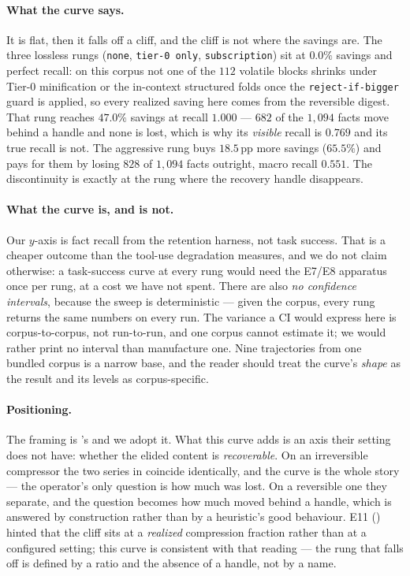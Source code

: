 \documentclass[11pt]{article}
\begin{document}
\paragraph{What the curve says.} It is flat, then it falls off a cliff, and the cliff is
not where the savings are. The three lossless rungs (\texttt{none}, \texttt{tier-0 only},
\texttt{subscription}) sit at $0.0\%$ savings and perfect recall: on this corpus not one of
the $112$ volatile blocks shrinks under Tier-0 minification or the in-context structured
folds once the \texttt{reject-if-bigger} guard is applied, so every realized saving here
comes from the reversible digest. That rung reaches $47.0\%$ savings at recall $1.000$ ---
$682$ of the $1{,}094$ facts move behind a handle and none is lost, which is why its
\emph{visible} recall is $0.769$ and its true recall is not. The aggressive rung buys
$18.5$\,pp more savings ($65.5\%$) and pays for them by losing $828$ of $1{,}094$ facts
outright, macro recall $0.551$. The discontinuity is exactly at the rung where the recovery
handle disappears.

\paragraph{What the curve is, and is not.} Our $y$-axis is fact recall from the retention
harness, not task success. That is a cheaper outcome than the tool-use degradation
\cite{controlcompression} measures, and we do not claim otherwise: a task-success curve at
every rung would need the E7/E8 apparatus once per rung, at a cost we have not spent. There
are also \emph{no confidence intervals}, because the sweep is deterministic --- given the
corpus, every rung returns the same numbers on every run. The variance a CI would express
here is corpus-to-corpus, not run-to-run, and one corpus cannot estimate it; we would rather
print no interval than manufacture one. Nine trajectories from one bundled corpus is a
narrow base, and the reader should treat the curve's \emph{shape} as the result and its
levels as corpus-specific.

\paragraph{Positioning.} The framing is \cite{controlcompression}'s and we adopt it. What
this curve adds is an axis their setting does not have: whether the elided content is
\emph{recoverable}. On an irreversible compressor the two series in 
coincide identically, and the curve is the whole story --- the operator's only question is
how much was lost. On a reversible one they separate, and the question becomes how much
moved behind a handle, which is answered by construction rather than by a heuristic's good
behaviour. E11 () hinted that the cliff sits at a \emph{realized} compression
fraction rather than at a configured setting; this curve is consistent with that reading ---
the rung that falls off is defined by a ratio and the absence of a handle, not by a name.
\end{document}

